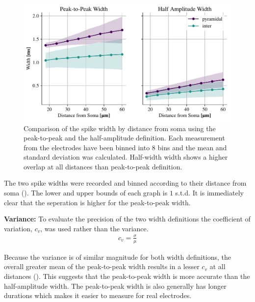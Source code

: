 \documentclass[altfont, fleqn]{uiophd}
\renewcommand{\cref}[1]{{\color{viridis_03}\mycref{#1}}}
\begin{document}
\begin{figure}[h]
    \begin{center}
        \includegraphics[width=\textwidth]{images/sec_4/int_pyr_widths_dist.pdf}
        \caption{
            Comparison of the spike width by distance from soma using the peak-to-peak
            and the half-amplitude definition.
            Each measurement from the electrodes have been binned into 8 bins
            and the mean and standard deviation was calculated. 
            Half-width width shows a higher overlap at all distances than peak-to-peak
            definition. 
        }
        \label{fig:4_width}
    \end{center}
\end{figure}

The two spike widths were recorded and binned according 
to their distance from soma
(\cref{fig:4_width}).
The lower and upper bounds of each graph is 
$1$ s.t.d.
It is immediately clear that the seperation 
is higher for the peak-to-peak width. 
\newline

\noindent
\textbf{Variance:}
To evaluate the precision of the two width definitions
the coefficient of variation, $c_v$,
was used rather than the variance. 
\begin{align}
    c_v = \frac{\sigma}{\mu}
\end{align}

Because the variance is of similar magnitude for both width definitions, 
the overall greater mean of the peak-to-peak width results in a
lesser $c_v$ at all distances 
(\cref{fig:4_width_snr}).
This suggests that 
the peak-to-peak width
is more accurate than the half-amplitude width. 
The peak-to-peak width is also generally has longer 
durations which makes it easier to measure for real electrodes. 
\end{document}
